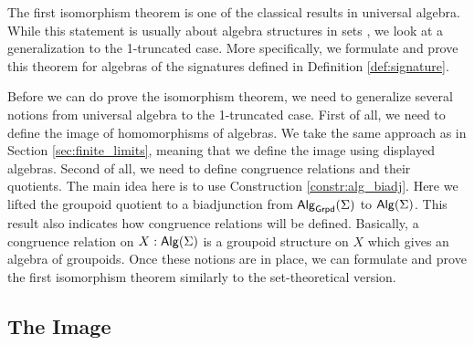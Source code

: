 The first isomorphism theorem is one of the classical results in universal algebra.
While this statement is usually about algebra structures in sets \cite{lynge2019}, we look at a generalization to the 1-truncated case.
More specifically, we formulate and prove this theorem for algebras of the signatures defined in Definition \ref{def:signature}.

Before we can do prove the isomorphism theorem, we need to generalize several notions from universal algebra to the 1-truncated case.
First of all, we need to define the image of homomorphisms of algebras.
We take the same approach as in Section \ref{sec:finite_limits}, meaning that we define the image using displayed algebras.
Second of all, we need to define congruence relations and their quotients.
The main idea here is to use Construction \ref{constr:alg_biadj}.
Here we lifted the groupoid quotient to a biadjunction from $\mathsf{Alg}_{\mathsf{Grpd}}(\Sigma)$ to $\mathsf{Alg}(\Sigma)$.
This result also indicates how congruence relations will be defined.
Basically, a congruence relation on $X : \mathsf{Alg}(\Sigma)$ is a groupoid structure on $X$ which gives an algebra of groupoids.
Once these notions are in place, we can formulate and prove the first isomorphism theorem similarly to the set-theoretical version.

\subsection{The Image}

